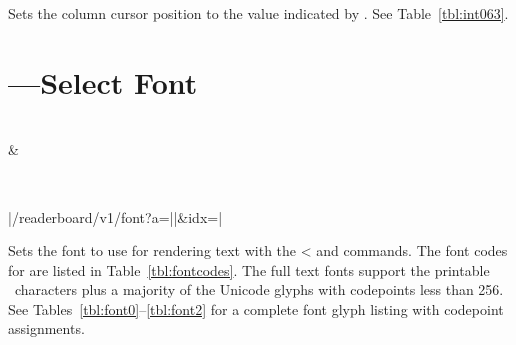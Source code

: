 Sets the column cursor position to the value indicated by . See Table~\ref{tbl:int063}. 

\section{---Select Font}
\begin{center}
\begin{bytefield}[endianness=little,bitwidth=0.11111\textwidth]{2}
	 \\
	 &
\end{bytefield}
\\
\begin{Coding}
	|/readerboard/v1/font?a=||&idx=|
\end{Coding}
\end{center}

Sets the font to use for rendering text with the \z< and  commands.
The font codes for  are listed in Table~\ref{tbl:fontcodes}.
The full text fonts support the printable \ascii\ characters plus a majority
of the Unicode glyphs with codepoints less than 256.  See Tables~\ref{tbl:font0}--\ref{tbl:font2}
for a complete font glyph listing with codepoint assignments.

